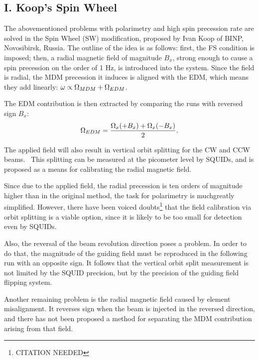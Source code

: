 \documentclass{article}
\begin{document}

\subsection{I. Koop's Spin Wheel}

The abovementioned problems with polarimetry and high spin precession rate are solved in the Spin Wheel (SW) modification, proposed by Ivan Koop of BINP, Novosibirsk, Russia. The outline of the idea is as follows: first, the FS condition is imposed; then, a radial magnetic field of magnitude $B_x$, strong enough to cause a spin precession on the order of 1 Hz, is introduced into the system. Since the field is radial, the MDM precession it induces is aligned with the EDM, which means they add linearly: $\omega \propto \Omega_{MDM} + \Omega_{EDM}$.

The EDM contribution is then extracted by comparing the runs with reversed sign $B_x$:~\cite[p. 1963]{Koop:IPAC13}
\[
\Omega_{EDM} = \frac{\Omega_x(+B_x) + \Omega_x(-B_x)}{2}.
\]

The applied field will also result in vertical orbit splitting for the CW and CCW beams.~\cite[p. 8]{Koop:SW_Presentation} This splitting can be measured at the picometer level by SQUIDs, and is proposed as a means for calibrating the radial magnetic field.

Since due to the applied field, the radial precession is ten orders of magnitude higher than in the original method, the task for polarimetry is muchgreatly simplified. However, there have been voiced doubts\footnote{CITATION NEEDED} that the field calibration via orbit splitting is a viable option, since it is likely to be too small for detection even by SQUIDs.

Also, the reversal of the beam revolution direction poses a problem. In order to do that, the magnitude of the guiding field must be reproduced in the following run with an opposite sign. It follows that the vertical orbit split measurement is not limited by the SQUID precision, but by the precision of the guiding field flipping system.

Another remaining problem is the radial magnetic field caused by element misalignment. It reverses sign when the beam is injected in the reversed direction, and there has not been proposed a method for separating the MDM contribution arising from that field.
\end{document}

